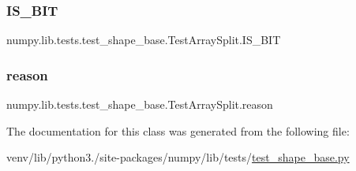 \subsubsection{\texorpdfstring{I\+S\+\_\+B\+IT}{IS\_64BIT}}
{\footnotesize\ttfamily numpy.\+lib.\+tests.\+test\+\_\+shape\+\_\+base.\+Test\+Array\+Split.\+I\+S\+\_\+B\+IT\hspace{0.3cm}{\ttfamily [static]}}

\mbox{\label{classnumpy_1_1lib_1_1tests_1_1test__shape__base_1_1TestArraySplit_a83cf71f1e74a07163f5a0d2db9993151}} 
\subsubsection{\texorpdfstring{reason}{reason}}
{\footnotesize\ttfamily numpy.\+lib.\+tests.\+test\+\_\+shape\+\_\+base.\+Test\+Array\+Split.\+reason\hspace{0.3cm}{\ttfamily [static]}}



The documentation for this class was generated from the following file\+:\begin{DoxyCompactItemize}
\item 
venv/lib/python3./site-\/packages/numpy/lib/tests/\hyperlink{lib_2tests_2test__shape__base_8py}{test\+\_\+shape\+\_\+base.\+py}\end{DoxyCompactItemize}

